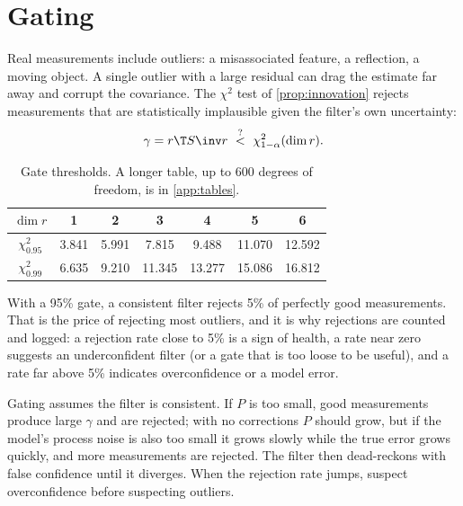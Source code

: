 \section{Gating}
\label{sec:gating}

Real measurements include outliers: a misassociated feature, a reflection, a moving object. A single outlier with a
large residual can drag the estimate far away and corrupt the covariance. The $\chi^2$ test of \cref{prop:innovation}
rejects measurements that are statistically implausible given the filter's own uncertainty:
\begin{equation}
  \gamma = r\T S\inv r \ \stackrel{?}{<}\ \chi^2_{1-\alpha}(\dim r).
\end{equation}

\begin{table}[h]
\centering\small
\begin{tabular}{@{}c c c c c c c@{}}
\toprule
$\dim r$ & 1 & 2 & 3 & 4 & 5 & 6 \\
\midrule
$\chi^2_{0.95}$ & 3.841 & 5.991 & 7.815 & 9.488 & 11.070 & 12.592 \\
$\chi^2_{0.99}$ & 6.635 & 9.210 & 11.345 & 13.277 & 15.086 & 16.812 \\
\bottomrule
\end{tabular}
\caption{Gate thresholds. A longer table, up to 600 degrees of freedom, is in \cref{app:tables}.}
\label{tab:chi2-short}
\end{table}

With a 95\% gate, a consistent filter rejects 5\% of perfectly good measurements. That is the price of rejecting
most outliers, and it is why rejections are counted and logged: a rejection rate close to 5\% is a sign of
health, a rate near zero suggests an underconfident filter (or a gate that is too loose to be useful), and a
rate far above 5\% indicates overconfidence or a model error.

\begin{pitfall}
Gating assumes the filter is consistent. If $P$ is too small, good measurements produce large $\gamma$ and are
rejected; with no corrections $P$ should grow, but if the model's process noise is also too small it grows slowly
while the true error grows quickly, and more measurements are rejected. The filter then dead-reckons with false
confidence until it diverges. When the rejection rate jumps, suspect overconfidence before suspecting outliers.
\end{pitfall}


